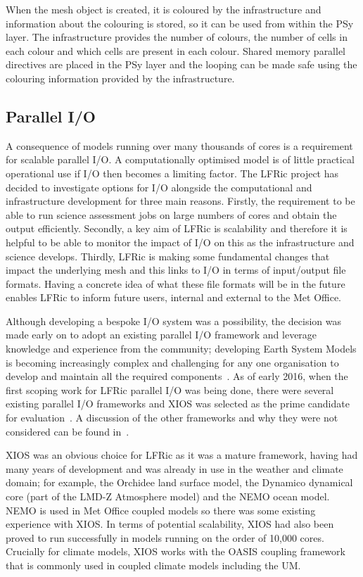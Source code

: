 \documentclass[review,times]{elsarticle}
\begin{document}
When the mesh object is created, it is coloured by the infrastructure
and information about the colouring is stored, so it can be used from
within the PSy layer. The infrastructure provides the number of colours,
the number of cells in each colour and which cells are present in each
colour. Shared memory parallel directives are placed in the PSy layer
and the looping can be made safe using the colouring information
provided by the infrastructure. 

\subsection{\label{sec:sub:io}Parallel I/O}

A consequence of models running over many thousands of cores is a requirement
for scalable parallel I/O. A computationally optimised model is of little practical
operational use if I/O then becomes a limiting factor. The LFRic project has
decided to investigate options for I/O alongside the computational
and infrastructure development for three main reasons. Firstly, the requirement
to be able to run science assessment jobs on large numbers of cores and obtain the
output efficiently. Secondly, a key aim of LFRic is scalability and therefore it is
helpful to be able to monitor the impact of I/O on this as the infrastructure and
science develops. Thirdly, LFRic is making some fundamental changes that impact the
underlying mesh and this links to I/O in terms of input/output file formats. Having
a concrete idea of what these file formats will be in the future enables LFRic to
inform future users, internal and external to the Met Office.

Although developing a bespoke I/O system was a possibility, the decision was
made early on to adopt an existing parallel I/O framework and leverage knowledge and
experience from the community; developing Earth System Models is becoming increasingly
complex and challenging for any one organisation to develop and maintain all the required
components~\cite{gmd-2017-186}.
As of early 2016, when the first scoping work for LFRic parallel I/O was being done,
there were several existing parallel I/O frameworks and XIOS was selected as the prime
candidate for evaluation~\cite{XIOSWiki}. A discussion of the other frameworks and why
they were not considered can be found in~\cite{Adams2018}.

XIOS was an obvious choice for LFRic as it was a mature framework, having had many years
of development and was already in use in the weather and climate domain; for example,
the Orchidee land surface model, the Dynamico dynamical core (part of the LMD-Z
Atmosphere model) and the NEMO ocean model. NEMO is used in Met Office coupled
models so there was some existing experience with XIOS. In terms of potential scalability,
XIOS had also been proved to run successfully in models running on the order of 10,000
cores. Crucially for climate models, XIOS works with the OASIS coupling framework that
is commonly used in coupled climate models including the UM. 
\end{document}
